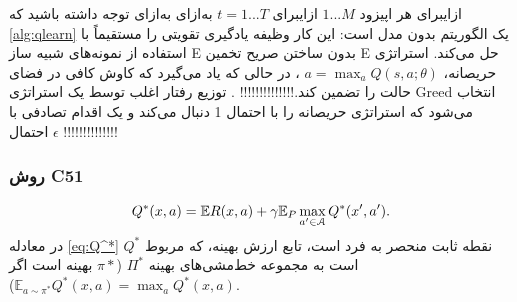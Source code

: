 ‌ازای{برای هر اپیزود 
$1...M$}
‌ازای{برای $t=1...T$}
  ‌به‌ازای
‌به‌ازای
\label{alg:qlearn}
توجه داشته باشید که \ref{alg:qlearn} یک الگوریتم بدون مدل است: این کار وظیفه یادگیری تقویتی را مستقیماً با استفاده از نمونه‌های شبیه ساز E بدون ساختن صریح تخمین E حل می‌کند.
 استراتژی حریصانه،
 $a = \max_{a} Q(s, a; \theta)$
 ، در حالی که یاد می‌گیرد که
کاوش کافی در فضای حالت را تضمین کند.!!!!!!!!!!!!!! . توزیع رفتار اغلب توسط یک استراتژی Greed انتخاب می‌شود که استراتژی حریصانه را با احتمال 1 دنبال می‌کند و یک
اقدام تصادفی با احتمال $\epsilon$
!!!!!!!!!!!!!!
\subsubsection{روش C51 }
\begin{align}
Q^*(x,a)= \mathbb{E} R(x,a)+\gamma \mathbb{E}_P \max_{a' \in \EuScript{A}} Q^* (x',a').
\label{eq:Q^*}
\end{align}
در معادله \ref{eq:Q^*} $Q^*$ نقطه ثابت منحصر به فرد است، تابع ارزش بهینه، که مربوط است به مجموعه خط‌مشی‌های بهینه 
$\Pi^*$
($\pi*$ بهینه است اگر
$\mathbb{E}_{a\sim \pi^*} Q^*(x,a) = \max_{a}Q^*(x,a).$)

